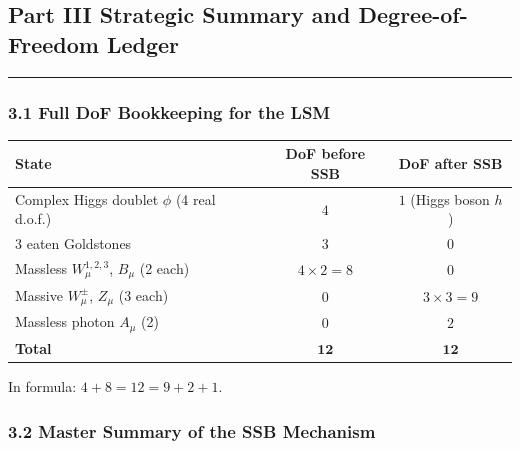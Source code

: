 \documentclass[12pt,a4paper]{article}
\begin{document}
\subsection*{Part III \quad Strategic Summary and Degree-of-Freedom Ledger}
\hrule\medskip

\subsubsection*{3.1 \quad Full DoF Bookkeeping for the LSM}

\begin{center}
\renewcommand{\arraystretch}{1.3}
\begin{tabular}{lcc}
\toprule
State & DoF before SSB & DoF after SSB \\
\midrule
Complex Higgs doublet $\phi$ (4 real d.o.f.) & $4$ & $1$ (Higgs boson $h$) \\
\quad $3$ eaten Goldstones & $3$ & $0$ \\[2pt]
Massless $W^{1,2,3}_\mu$, $B_\mu$ (2 each) & $4\times 2 = 8$ & $0$ \\
Massive $W^\pm_\mu$, $Z_\mu$ (3 each) & $0$ & $3\times 3 = 9$ \\
Massless photon $A_\mu$ (2) & $0$ & $2$ \\
\midrule
\textbf{Total} & $\mathbf{12}$ & $\mathbf{12}$ \\
\bottomrule
\end{tabular}
\end{center}

In formula: $4 + 8 = 12 = 9 + 2 + 1$.

\subsubsection*{3.2 \quad Master Summary of the SSB Mechanism}
\end{document}
